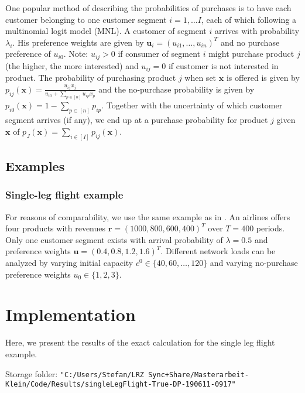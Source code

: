 One popular method of describing the probabilities of purchases is to have each customer belonging to one customer segment $i = 1, \dots I$, each of which following a multinomial logit model (MNL). A customer of segment $i$ arrives with probability $\lambda_i$. His preference weights are given by $\boldsymbol{u}_i = (u_{i1}, \dots, u_{in})^T$ and no purchase preference of $u_{i0}$. Note: $u_{ij} > 0$ if consumer of segment $i$ might purchase product $j$ (the higher, the more interested) and $u_{ij} = 0$ if customer is not interested in product. The probability of purchasing product $j$ when set $\boldsymbol{x}$ is offered is given by $p_{ij}(\boldsymbol{x}) = \frac{u_{ij}x_j}{u_{i0} + \sum_{p\in[n]} u_{ip}x_p}$ and the no-purchase probability is given by $p_{i0}(\boldsymbol{x}) = 1 - \sum_{p\in[n]}p_{ip}$. Together with the uncertainty of which customer segment arrives (if any), we end up at a purchase probability for product $j$ given $\boldsymbol{x}$ of $p_J(\boldsymbol{x}) = \sum_{i \in [I]} p_{ij}(\boldsymbol{x})$.

\subsection{Examples}

\subsubsection{Single-leg flight example}

For reasons of comparability, we use the same example as in \cite{Koch.2017}. An airlines offers four products with revenues $\boldsymbol{r} = (1000, 800, 600, 400)^T$ over $T = 400$ periods. Only one customer segment exists with arrival probability of $\lambda = 0.5$ and preference weights $\boldsymbol{u} = (0.4, 0.8, 1.2, 1.6)^T$. Different network loads can be analyzed by varying initial capacity $c^0 \in \{40, 60, \dots, 120\}$ and varying no-purchase preference weights $u_0 \in \{1,2,3\}$.

\section{Implementation}

Here, we present the results of the exact calculation for the single leg flight example.

Storage folder: \texttt{"C:/Users/Stefan/LRZ Sync+Share/Masterarbeit-Klein/Code/Results/singleLegFlight-True-DP-190611-0917"}

